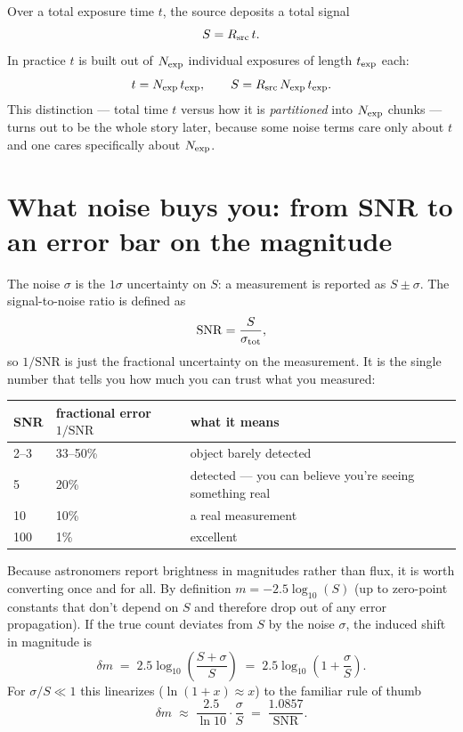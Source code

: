 \documentclass[11pt]{article}
\begin{document}
Over a total exposure time $t$, the source deposits a total signal
\begin{equation}
S = R_{\rm src}\, t .
\end{equation}
In practice $t$ is built out of $N_{\rm exp}$ individual exposures of length $t_{\rm exp}$ each:
\begin{equation}
t = N_{\rm exp}\, t_{\rm exp}, \qquad S = R_{\rm src}\, N_{\rm exp}\, t_{\rm exp}.
\end{equation}
This distinction --- total time $t$ versus how it is \emph{partitioned} into $N_{\rm exp}$ chunks ---
turns out to be the whole story later, because some noise terms care only about $t$ and one cares
specifically about $N_{\rm exp}$.

\section*{What noise buys you: from SNR to an error bar on the magnitude}

The noise $\sigma$ is the $1\sigma$ uncertainty on $S$: a measurement is reported as $S \pm \sigma$.
The signal-to-noise ratio is defined as
\begin{equation}
\mathrm{SNR} = \frac{S}{\sigma_{\rm tot}},
\end{equation}
so $1/\mathrm{SNR}$ is just the fractional uncertainty on the measurement. It is the single number
that tells you how much you can trust what you measured:

\begin{center}
\begin{tabular}{@{}l l p{7.2cm}@{}}
\toprule
\textbf{SNR} & \textbf{fractional error $1/\mathrm{SNR}$} & \textbf{what it means} \\
\midrule
2--3 & 33--50\% & object barely detected \\
5 & 20\% & detected --- you can believe you're seeing something real \\
10 & 10\% & a real measurement \\
100 & 1\% & excellent \\
\bottomrule
\end{tabular}
\end{center}

Because astronomers report brightness in magnitudes rather than flux, it is worth converting once and
for all. By definition $m = -2.5\log_{10}(S)$ (up to zero-point constants that don't depend on $S$ and
therefore drop out of any error propagation). If the true count deviates from $S$ by the noise
$\sigma$, the induced shift in magnitude is
\begin{equation}
\delta m \;=\; 2.5\log_{10}\!\left(\frac{S+\sigma}{S}\right) \;=\; 2.5\log_{10}\!\left(1+\frac{\sigma}{S}\right).
\end{equation}
For $\sigma/S \ll 1$ this linearizes ($\ln(1+x)\approx x$) to the familiar rule of thumb
\begin{equation}
\delta m \;\approx\; \frac{2.5}{\ln 10}\cdot\frac{\sigma}{S} \;=\; \frac{1.0857}{\mathrm{SNR}}.
\label{eq:dmag-approx}
\end{equation}
\end{document}
